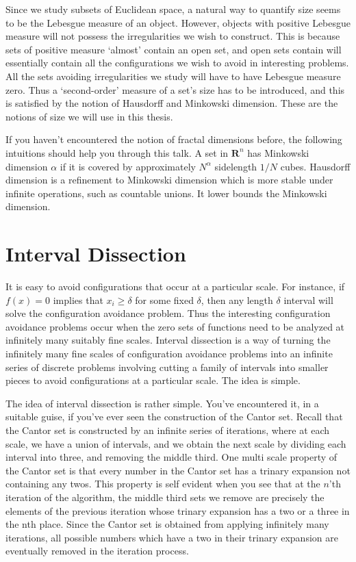 \documentclass{report}
\theoremstyle{plain}
\theoremstyle{plain}
\begin{document}
Since we study subsets of Euclidean space, a natural way to quantify size seems to be the Lebesgue measure of an object. However, objects with positive Lebesgue measure will not possess the irregularities we wish to construct. This is because sets of positive measure `almost' contain an open set, and open sets contain will essentially contain all the configurations we wish to avoid in interesting problems. All the sets avoiding irregularities we study will have to have Lebesgue measure zero. Thus a `second-order' measure of a set's size has to be introduced, and this is satisfied by the notion of Hausdorff and Minkowski dimension. These are the notions of size we will use in this thesis.

If you haven't encountered the notion of fractal dimensions before, the following intuitions should help you through this talk. A set in $\mathbf{R}^n$ has Minkowski dimension $\alpha$ if it is covered by approximately $N^\alpha$ sidelength $1/N$ cubes. Hausdorff dimension is a refinement to Minkowski dimension which is more stable under infinite operations, such as countable unions. It lower bounds the Minkowski dimension.


\section{Interval Dissection}

It is easy to avoid configurations that occur at a particular scale. For instance, if $f(x) = 0$ implies that $x_i \geq \delta$ for some fixed $\delta$, then any length $\delta$ interval will solve the configuration avoidance problem. Thus the interesting configuration avoidance problems occur when the zero sets of functions need to be analyzed at infinitely many suitably fine scales. Interval dissection is a way of turning the infinitely many fine scales of configuration avoidance problems into an infinite series of discrete problems involving cutting a family of intervals into smaller pieces to avoid configurations at a particular scale. The idea is simple.

The idea of interval dissection is rather simple. You've encountered it, in a suitable guise, if you've ever seen the construction of the Cantor set. Recall that the Cantor set is constructed by an infinite series of iterations, where at each scale, we have a union of intervals, and we obtain the next scale by dividing each interval into three, and removing the middle third. One multi scale property of the Cantor set is that every number in the Cantor set has a trinary expansion not containing any twos. This property is self evident when you see that at the $n$'th iteration of the algorithm, the middle third sets we remove are precisely the elements of the previous iteration whose trinary expansion has a two or a three in the nth place. Since the Cantor set is obtained from applying infinitely many iterations, all possible numbers which have a two in their trinary expansion are eventually removed in the iteration process.
\end{document}
